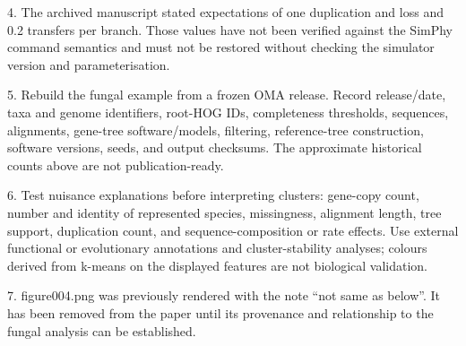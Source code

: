 4. The archived manuscript stated expectations of one duplication and loss and 0.2 transfers per branch. Those values
have not been verified against the SimPhy command semantics and must not be restored without checking the simulator
version and parameterisation.

5. Rebuild the fungal example from a frozen OMA release. Record release/date, taxa and genome identifiers, root-HOG IDs,
completeness thresholds, sequences, alignments, gene-tree software/models, filtering, reference-tree construction,
software versions, seeds, and output checksums. The approximate historical counts above are not publication-ready.

6. Test nuisance explanations before interpreting clusters: gene-copy count, number and identity of represented species,
missingness, alignment length, tree support, duplication count, and sequence-composition or rate effects. Use external
functional or evolutionary annotations and cluster-stability analyses; colours derived from k-means on the displayed
features are not biological validation.

7. figure004.png was previously rendered with the note ``not same as below''. It has been removed from the paper until
its provenance and relationship to the fungal analysis can be established.
\fi
